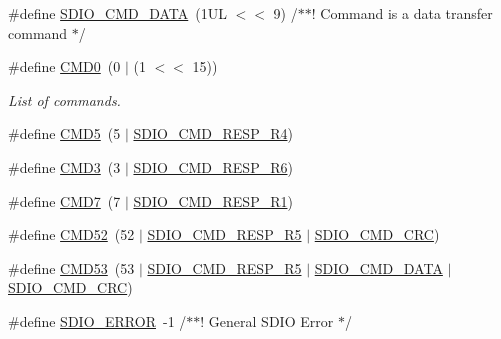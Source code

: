\begin{DoxyCompactItemize}
\#define \hyperlink{group___s_d_i_o__18_x_x__43_x_x_gaca11da76712b05c2717f87d22cb595ec}{S\+D\+I\+O\+\_\+\+C\+M\+D\+\_\+\+D\+A\+TA}~(1\+U\+L $<$$<$ 9)  /$\ast$$\ast$! Command is a data transfer command $\ast$/
\item 
\#define \hyperlink{group___s_d_i_o__18_x_x__43_x_x_ga938c1466755f12fb04ac0d1b775584d1}{C\+M\+D0}~(0 $\vert$ (1 $<$$<$ 15))
\begin{DoxyCompactList}\small\item\em List of commands. \end{DoxyCompactList}\item 
\#define \hyperlink{group___s_d_i_o__18_x_x__43_x_x_gaf1f24155531bae5091603a273a426437}{C\+M\+D5}~(5 $\vert$ \hyperlink{group___s_d_i_o__18_x_x__43_x_x_ga16e699b4a068de39f712e5605e730260}{S\+D\+I\+O\+\_\+\+C\+M\+D\+\_\+\+R\+E\+S\+P\+\_\+\+R4})
\item 
\#define \hyperlink{group___s_d_i_o__18_x_x__43_x_x_ga130f4c4e31a70d8f61750a581687e39a}{C\+M\+D3}~(3 $\vert$ \hyperlink{group___s_d_i_o__18_x_x__43_x_x_ga935f51abdef49f44cde7c6978b829618}{S\+D\+I\+O\+\_\+\+C\+M\+D\+\_\+\+R\+E\+S\+P\+\_\+\+R6})
\item 
\#define \hyperlink{group___s_d_i_o__18_x_x__43_x_x_ga8d3c60653ad9483b8f3d276cc838a3c9}{C\+M\+D7}~(7 $\vert$ \hyperlink{group___s_d_i_o__18_x_x__43_x_x_ga74936e4059fa646fdd3a62c68252e3bc}{S\+D\+I\+O\+\_\+\+C\+M\+D\+\_\+\+R\+E\+S\+P\+\_\+\+R1})
\item 
\#define \hyperlink{group___s_d_i_o__18_x_x__43_x_x_gaf9a0a4575ef1e94446e8ef6d69120081}{C\+M\+D52}~(52 $\vert$ \hyperlink{group___s_d_i_o__18_x_x__43_x_x_ga6fa4ac27f75edbdf59f840cecd675f9f}{S\+D\+I\+O\+\_\+\+C\+M\+D\+\_\+\+R\+E\+S\+P\+\_\+\+R5} $\vert$ \hyperlink{group___s_d_i_o__18_x_x__43_x_x_ga7faeb5b3ae0de2806d36876b625cded6}{S\+D\+I\+O\+\_\+\+C\+M\+D\+\_\+\+C\+RC})
\item 
\#define \hyperlink{group___s_d_i_o__18_x_x__43_x_x_gaa2da002d132a2f8393b9b17e080f7b28}{C\+M\+D53}~(53 $\vert$ \hyperlink{group___s_d_i_o__18_x_x__43_x_x_ga6fa4ac27f75edbdf59f840cecd675f9f}{S\+D\+I\+O\+\_\+\+C\+M\+D\+\_\+\+R\+E\+S\+P\+\_\+\+R5} $\vert$ \hyperlink{group___s_d_i_o__18_x_x__43_x_x_gaca11da76712b05c2717f87d22cb595ec}{S\+D\+I\+O\+\_\+\+C\+M\+D\+\_\+\+D\+A\+TA} $\vert$ \hyperlink{group___s_d_i_o__18_x_x__43_x_x_ga7faeb5b3ae0de2806d36876b625cded6}{S\+D\+I\+O\+\_\+\+C\+M\+D\+\_\+\+C\+RC})
\item 
\#define \hyperlink{group___s_d_i_o__18_x_x__43_x_x_ga4a2fc3d864c16f1ddea88220e19b15a1}{S\+D\+I\+O\+\_\+\+E\+R\+R\+OR}~-\/1 /$\ast$$\ast$! General S\+D\+IO Error $\ast$/

\end{DoxyCompactItemize}
